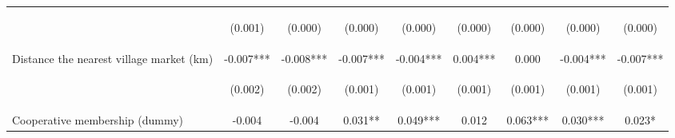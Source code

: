 \begin{center}
\begin{tabular}{lcccccccc}
\vspace{4pt} & \begin{footnotesize}(0.001)\end{footnotesize} & \begin{footnotesize}(0.000)\end{footnotesize} & \begin{footnotesize}(0.000)\end{footnotesize} & \begin{footnotesize}(0.000)\end{footnotesize} & \begin{footnotesize}(0.000)\end{footnotesize} & \begin{footnotesize}(0.000)\end{footnotesize} & \begin{footnotesize}(0.000)\end{footnotesize} & \begin{footnotesize}(0.000)\end{footnotesize} \\
Distance the nearest village market (km) & -0.007*** & -0.008*** & -0.007*** & -0.004*** & 0.004*** & 0.000 & -0.004*** & -0.007*** \\
\vspace{4pt} & \begin{footnotesize}(0.002)\end{footnotesize} & \begin{footnotesize}(0.002)\end{footnotesize} & \begin{footnotesize}(0.001)\end{footnotesize} & \begin{footnotesize}(0.001)\end{footnotesize} & \begin{footnotesize}(0.001)\end{footnotesize} & \begin{footnotesize}(0.001)\end{footnotesize} & \begin{footnotesize}(0.001)\end{footnotesize} & \begin{footnotesize}(0.001)\end{footnotesize} \\
Cooperative membership (dummy) & -0.004 & -0.004 & 0.031** & 0.049*** & 0.012 & 0.063*** & 0.030*** & 0.023* \\

\end{tabular}
\end{center}
